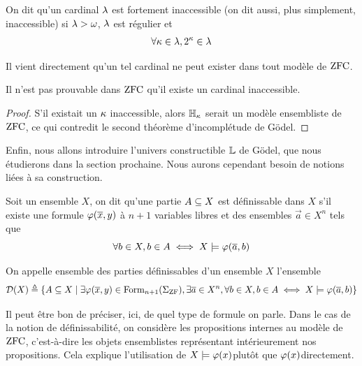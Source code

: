 \begin{definition}
  On dit qu'un cardinal $\lambda$ est fortement inaccessible (on dit aussi, plus
  simplement, inaccessible) si $\lambda > \omega$, $\lambda$ est régulier et
  \[\forall \kappa \in \lambda, 2^\kappa \in \lambda\]
\end{definition}

Il vient directement qu'un tel cardinal ne peut exister dans tout modèle de
$\operatorname{ZFC}$.

\begin{proposition}
  Il n'est pas prouvable dans $\operatorname{ZFC}$ qu'il existe un cardinal inaccessible.
\end{proposition}

\begin{proof}
  S'il existait un $\kappa$ inaccessible, alors $\mathbb H_\kappa$ serait un modèle
  ensembliste de $\operatorname{ZFC}$, ce qui contredit le second théorème d'incomplétude de
  Gödel.
\end{proof}

Enfin, nous allons introduire l'univers constructible $\mathbb L$ de Gödel, que
nous étudierons dans la section prochaine. Nous aurons cependant besoin de
notions liées à sa construction.

\begin{definition}\label{def.definissable.L}
  Soit un ensemble $X$, on dit qu'une partie $A\subseteq X$ est
  définissable dans $X$ s'il existe une formule $\varphi(\overline{x},y)$ à $n+1$
  variables libres et des ensembles $\vec a \in X^n$ tels que
  \[\forall b \in X, b \in A \iff X\models \varphi(\overline{a},b)\]

  \noindent
  On appelle ensemble des parties définissables d'un ensemble $X$ l'ensemble
  \[\mathcal{D}(X) \triangleq \left\{ A \subseteq X \;\middle\vert\; \exists
    \varphi(\overline{x},y)\in\operatorname{Form}_{n+1}(\Sigma_{\operatorname{ZF}}),
    \exists \overline{a} \in X^n, \forall b \in X, b \in A \iff X \models
    \varphi(\overline{a},b) \right\}\]
\end{definition}

\begin{remark}
  Il peut être bon de préciser, ici, de quel type de formule on parle. Dans le
  cas de la notion de définissabilité, on considère les propositions internes
  au modèle de $\operatorname{ZFC}$, c'est-à-dire les objets ensemblistes représentant
  intérieurement nos propositions. Cela explique l'utilisation de
  \og $X\models \varphi(x)$\fg plutôt que \og$\varphi(x)$\fg directement.
\end{remark}

